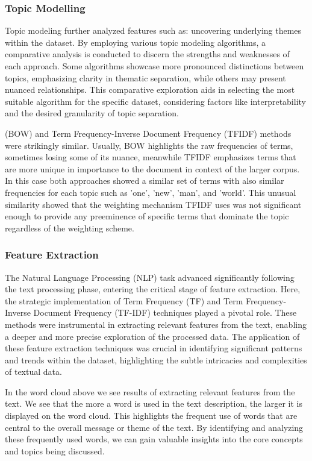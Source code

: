 \documentclass{article}
\begin{document}
\begin{multicols}{2}
\subsubsection{Topic Modelling}

Topic modeling further analyzed features such as: uncovering underlying themes within the dataset. By employing various topic modeling algorithms, a comparative analysis is conducted to discern the strengths and weaknesses of each approach. Some algorithms showcase more pronounced distinctions between topics, emphasizing clarity in thematic separation, while others may present nuanced relationships. This comparative exploration aids in selecting the most suitable algorithm for the specific dataset, considering factors like interpretability and the desired granularity of topic separation.

(BOW) and Term Frequency-Inverse Document Frequency (TFIDF) methods were strikingly similar. Usually, BOW highlights the raw frequencies of terms, sometimes losing some of its nuance, meanwhile TFIDF emphasizes terms that are more unique in importance to the document in context of the larger corpus. In this case both approaches showed a similar set of terms with also similar frequencies for each topic such as 'one', 'new', 'man', and 'world'. This unusual similarity showed that the weighting mechanism TFIDF uses was not significant enough to provide any preeminence of specific terms that dominate the topic regardless of the weighting scheme.

\subsubsection{Feature Extraction}

The Natural Language Processing (NLP) task advanced significantly following the text processing phase, entering the critical stage of feature extraction. Here, the strategic implementation of Term Frequency (TF) and Term Frequency-Inverse Document Frequency (TF-IDF) techniques played a pivotal role. These methods were instrumental in extracting relevant features from the text, enabling a deeper and more precise exploration of the processed data. The application of these feature extraction techniques was crucial in identifying significant patterns and trends within the dataset, highlighting the subtle intricacies and complexities of textual data.

In the word cloud above we see results of extracting relevant features from the text. We see that the more a word is used in the text description, the larger it is displayed on the word cloud. This highlights the frequent use of words that are central to the overall message or theme of the text. By identifying and analyzing these frequently used words, we can gain valuable insights into the core concepts and topics being discussed.


\end{multicols}
\end{document}
